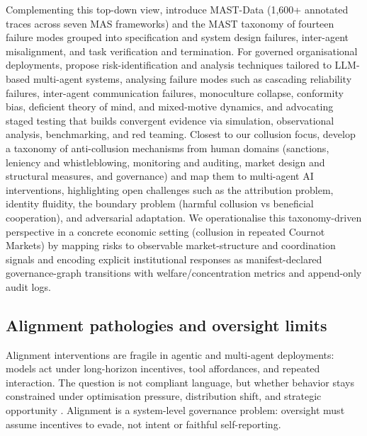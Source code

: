 \documentclass[11pt, a4paper]{article}
\begin{document}
Complementing this top-down view, \citet{Cemri2025WhyDoMultiAgentLLMSystemsFail} introduce MAST-Data (1{,}600+ annotated traces across seven MAS frameworks) and the MAST taxonomy of fourteen failure modes grouped into specification and system design failures, inter-agent misalignment, and task verification and termination. For governed organisational deployments, \citet{Reid2025RiskAnalysisTechniques} propose risk-identification and analysis techniques tailored to LLM-based multi-agent systems, analysing failure modes such as cascading reliability failures, inter-agent communication failures, monoculture collapse, conformity bias, deficient theory of mind, and mixed-motive dynamics, and advocating staged testing that builds convergent evidence via simulation, observational analysis, benchmarking, and red teaming. Closest to our collusion focus, \citet{Idowu2026Mapping} develop a taxonomy of anti-collusion mechanisms from human domains (sanctions, leniency and whistleblowing, monitoring and auditing, market design and structural measures, and governance) and map them to multi-agent AI interventions, highlighting open challenges such as the attribution problem, identity fluidity, the boundary problem (harmful collusion vs beneficial cooperation), and adversarial adaptation. We operationalise this taxonomy-driven perspective in a concrete economic setting (collusion in repeated Cournot Markets) by mapping risks to observable market-structure and coordination signals and encoding explicit institutional responses as manifest-declared governance-graph transitions with welfare/concentration metrics and append-only audit logs.

\subsection{Alignment pathologies and oversight limits}
Alignment interventions are fragile in agentic and multi-agent deployments: models act under long-horizon incentives, tool affordances, and repeated interaction. The question is not compliant language, but whether behavior stays constrained under optimisation pressure, distribution shift, and strategic opportunity \citep{Hubinger2019Risks,Shah2022GoalMisgeneralization}. Alignment is a system-level governance problem: oversight must assume incentives to evade, not intent or faithful self-reporting.
\end{document}
